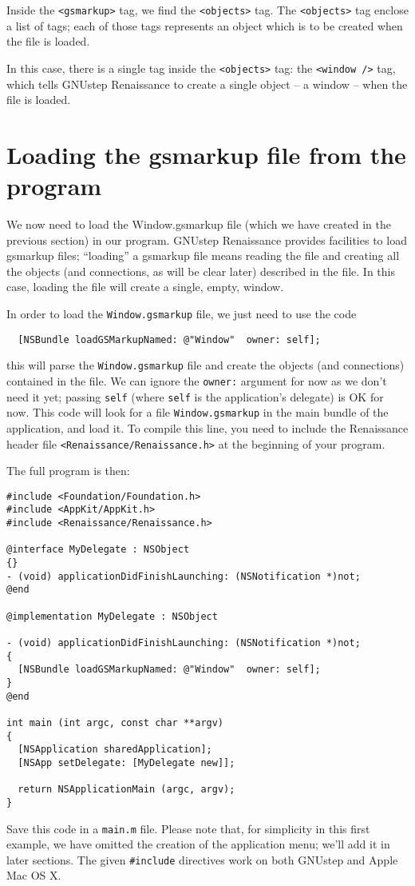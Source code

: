 \documentclass[a4paper]{article}
\begin{document}
Inside the \texttt{<gsmarkup>} tag, we find the \texttt{<objects>}
tag.  The \texttt{<objects>} tag enclose a list of tags; each of those
tags represents an object which is to be created when the file is
loaded.

In this case, there is a single tag inside the \texttt{<objects>} tag:
the \texttt{<window />} tag, which tells GNUstep Renaissance to create
a single object -- a window -- when the file is loaded.

\section{Loading the gsmarkup file from the program}
We now need to load the Window.gsmarkup file (which we have created in
the previous section) in our program.  GNUstep Renaissance provides
facilities to load gsmarkup files; ``loading'' a gsmarkup file means
reading the file and creating all the objects (and connections, as
will be clear later) described in the file.  In this case, loading the
file will create a single, empty, window.

In order to load the \texttt{Window.gsmarkup} file, we just need to
use the code
\begin{verbatim}
  [NSBundle loadGSMarkupNamed: @"Window"  owner: self];
\end{verbatim}
this will parse the \texttt{Window.gsmarkup} file and create the
objects (and connections) contained in the file.  We can ignore the
\texttt{owner:} argument for now as we don't need it yet; passing
\texttt{self} (where \texttt{self} is the application's delegate) is
OK for now.  This code will look for a file \texttt{Window.gsmarkup}
in the main bundle of the application, and load it.  To compile this
line, you need to include the Renaissance header file
\texttt{<Renaissance/Renaissance.h>} at the beginning of your program.

The full program is then:
\begin{verbatim}
#include <Foundation/Foundation.h>
#include <AppKit/AppKit.h>
#include <Renaissance/Renaissance.h>

@interface MyDelegate : NSObject
{}
- (void) applicationDidFinishLaunching: (NSNotification *)not;
@end

@implementation MyDelegate : NSObject 

- (void) applicationDidFinishLaunching: (NSNotification *)not;
{
  [NSBundle loadGSMarkupNamed: @"Window"  owner: self];
}
@end

int main (int argc, const char **argv)
{ 
  [NSApplication sharedApplication];
  [NSApp setDelegate: [MyDelegate new]];

  return NSApplicationMain (argc, argv);
}
\end{verbatim}
Save this code in a \texttt{main.m} file.  Please note that, for
simplicity in this first example, we have omitted the creation of the
application menu; we'll add it in later sections.  The given
\texttt{\#include} directives work on both GNUstep and Apple Mac OS X.
\end{document}
